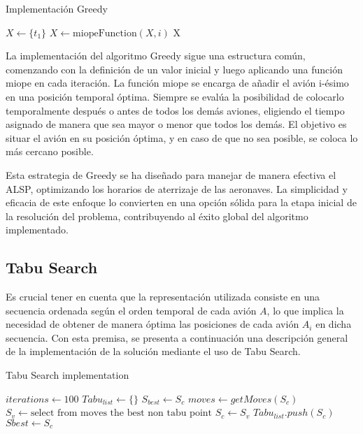 \documentclass[letter, 10pt]{article}
\begin{document}
\begin{algorithm}
\caption{Implementaci\'on Greedy}
\begin{algorithmic}
\State $X \gets \{t_1\}$ 
\State $X \gets \text{miopeFunction}(X,i)$ 
\EndFor
\State \Return X
\EndFunction
\end{algorithmic}
\end{algorithm}

La implementaci\'on del algoritmo Greedy sigue una estructura com\'un, comenzando con la definici\'on de un valor inicial y luego aplicando una funci\'on miope en cada iteraci\'on. La funci\'on miope se encarga de a\~{n}adir el avi\'on i-\'esimo en una posici\'on temporal \'optima. Siempre se eval\'ua la posibilidad de colocarlo temporalmente despu\'es o antes de todos los dem\'as aviones, eligiendo el tiempo asignado de manera que sea mayor o menor que todos los dem\'as. El objetivo es situar el avi\'on en su posici\'on \'optima, y en caso de que no sea posible, se coloca lo m\'as cercano posible.

Esta estrategia de Greedy se ha dise\~{n}ado para manejar de manera efectiva el ALSP, optimizando los horarios de aterrizaje de las aeronaves. La simplicidad y eficacia de este enfoque lo convierten en una opci\'on s\'olida para la etapa inicial de la resoluci\'on del problema, contribuyendo al \'exito global del algoritmo implementado.


\subsection{Tabu Search}
Es crucial tener en cuenta que la representaci\'on utilizada consiste en una secuencia ordenada seg\'un el orden temporal de cada avi\'on $A$, lo que implica la necesidad de obtener de manera \'optima las posiciones de cada avi\'on $A_i$ en dicha secuencia. Con esta premisa, se presenta a continuaci\'on una descripci\'on general de la implementaci\'on de la soluci\'on mediante el uso de Tabu Search.

\begin{algorithm}
\caption{Tabu Search implementation}
\begin{algorithmic}
\State $iterations \gets 100$
\State $Tabu_{list} \gets \{\}$
\State $S_{best} \gets S_c$
\State $moves \gets getMoves(S_c)$
\State $S_v \gets \text{select from moves the best non tabu point}$
\State $S_c \gets S_v$
\State $Tabu_{list}.push(S_c)$
    \State $Sbest \gets S_c$
\EndIf
\EndWhile
\EndFunction
\end{algorithmic}
\end{algorithm}
\end{document}
